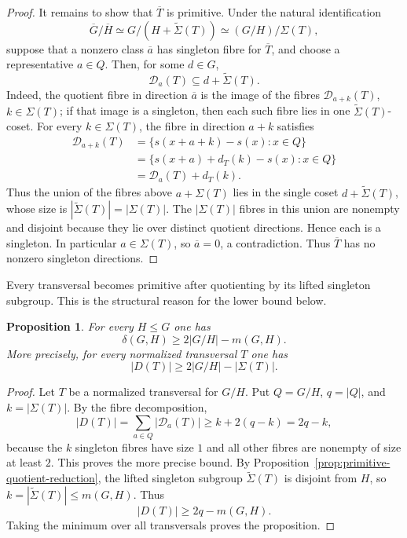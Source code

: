\documentclass[reqno]{amsart}
\numberwithin{equation}{section}
\newtheorem{proposition}[theorem]{Proposition}
\theoremstyle{definition}
\begin{document}
\begin{proof}
It remains to show that $\overline T$ is primitive.  Under the natural
identification
\[
  \overline G/\overline H
  \simeq
  G/(H+\widetilde\Sigma(T))
  \simeq
  (G/H)/\Sigma(T),
\]
suppose that a nonzero class $\overline a$ has singleton fibre for
$\overline T$, and choose a representative $a\in Q$.  Then, for some $d\in G$,
\[
  \mathcal D_a(T)\subseteq d+\widetilde\Sigma(T).
\]
Indeed, the quotient fibre in direction \(\overline a\) is the image of the
fibres \(\mathcal D_{a+k}(T)\), \(k\in\Sigma(T)\); if that image is a singleton,
then each such fibre lies in one \(\widetilde\Sigma(T)\)-coset.
For every $k\in\Sigma(T)$, the fibre in direction $a+k$ satisfies
\[
\begin{aligned}
  \mathcal D_{a+k}(T)
  &=\{s(x+a+k)-s(x):x\in Q\} \\
  &=\{s(x+a)+d_T(k)-s(x):x\in Q\} \\
  &=\mathcal D_a(T)+d_T(k).
\end{aligned}
\]
Thus the union of the fibres above $a+\Sigma(T)$ lies in the single coset
$d+\widetilde\Sigma(T)$, whose size is
$|\widetilde\Sigma(T)|=|\Sigma(T)|$.  The $|\Sigma(T)|$ fibres in this union are
nonempty and disjoint because they lie over distinct quotient directions.
Hence each is a singleton.  In particular $a\in\Sigma(T)$, so
$\overline a=0$, a contradiction.  Thus $\overline T$ has no nonzero singleton
directions.
\end{proof}

Every transversal becomes primitive after quotienting by its lifted singleton
subgroup.  This is the structural reason for the lower bound below.

\begin{proposition}
\label{prop:quotient-fibre-lower-bound}
For every $H\leq G$ one has
\[
  \delta(G,H)\geq 2|G/H|-m(G,H).
\]
More precisely, for every normalized transversal $T$ one has
\[
  |D(T)|\geq 2|G/H|-|\Sigma(T)|.
\]
\end{proposition}

\begin{proof}
Let $T$ be a normalized transversal for $G/H$.  Put $Q=G/H$, $q=|Q|$, and
$k=|\Sigma(T)|$.  By the fibre decomposition,
\[
  |D(T)|
  =\sum_{a\in Q}|\mathcal D_a(T)|
  \geq k+2(q-k)
  =2q-k,
\]
because the $k$ singleton fibres have size $1$ and all other fibres are nonempty
of size at least $2$.  This proves the more precise bound.  By
Proposition~\ref{prop:primitive-quotient-reduction}, the lifted singleton
subgroup $\widetilde\Sigma(T)$ is disjoint from $H$, so
$k=|\widetilde\Sigma(T)|\leq m(G,H)$.
Thus
\[
  |D(T)|\geq 2q-m(G,H).
\]
Taking the minimum over all transversals proves the proposition.
\end{proof}
\end{document}
